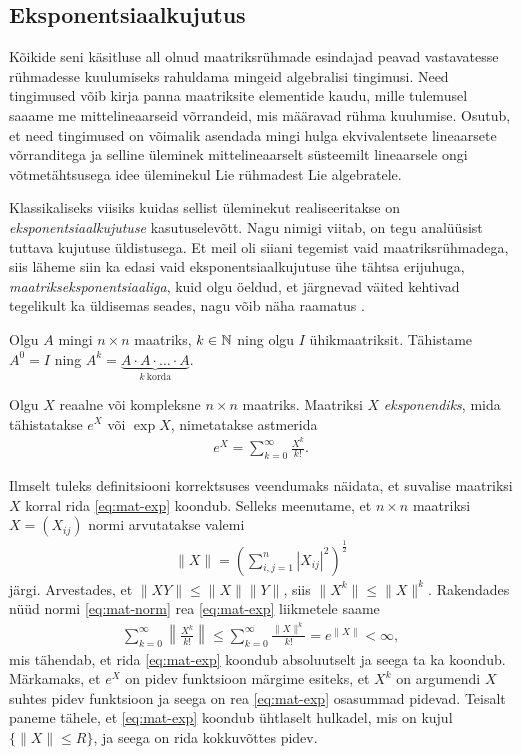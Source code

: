 \subsection{Eksponentsiaalkujutus}

Kõikide seni käsitluse all olnud maatriksrühmade esindajad peavad
vastavatesse rühmadesse kuulumiseks rahuldama mingeid algebralisi tingimusi.
Need tingimused võib kirja panna maatriksite elementide kaudu, mille
tulemusel saaame me mittelineaarseid võrrandeid, mis määravad rühma kuulumise.
Osutub, et need tingimused on võimalik asendada mingi hulga ekvivalentsete
lineaarsete võrranditega ja selline üleminek mittelineaarselt süsteemilt
lineaarsele ongi võtmetähtsusega idee üleminekul Lie rühmadest Lie
algebratele.\cite{johan1989survey}

Klassikaliseks viisiks kuidas sellist üleminekut realiseeritakse on
\emph{eksponentsiaalkujutuse} kasutuselevõtt. Nagu nimigi viitab, on
tegu analüüsist tuttava kujutuse üldistusega. Et meil oli siiani tegemist
vaid maatriksrühmadega, siis läheme siin ka edasi vaid eksponentsiaalkujutuse
ühe tähtsa erijuhuga, \emph{maatrikseksponentsiaaliga}, kuid olgu öeldud,
et järgnevad väited kehtivad tegelikult ka üldisemas seades,
nagu võib näha raamatus \cite{kirillov2008introduction}.

Olgu $A$ mingi $n \times n$ maatriks, $k \in \mathbb{N}$ ning olgu $I$
ühikmaatriksit. Tähistame $A^0 = I$ ning
$A^k = \underbrace{A \cdot A \cdot \ldots \cdot A}_{k\ \text{korda}}$.

\begin{dfn}
    Olgu $X$ reaalne või kompleksne $n \times n$ maatriks. Maatriksi
    $X$ \emph{eksponendiks}, mida tähistatakse $e^X$ või $\exp X$, nimetatakse
    astmerida
    \begin{align}\label{eq:mat-exp}
        e^X = \sum_{k=0}^{\infty} \frac{X^k}{k!}.
    \end{align}
\end{dfn}

Ilmselt tuleks definitsiooni korrektsuses veendumaks näidata, et suvalise
maatriksi $X$ korral rida \eqref{eq:mat-exp} koondub. Selleks meenutame,
et $n \times n$ maatriksi $X = (X_{ij})$ normi arvutatakse valemi
\begin{align}\label{eq:mat-norm}
    \| X \| = \left( \sum_{i,j=1}^n |X_{ij}|^2 \right)^{\frac{1}{2}}
\end{align}
järgi. Arvestades, et $\| XY \| \le \|X\| \|Y\|$, siis $\|X^k\| \le \|X\|^k$.
Rakendades nüüd normi \eqref{eq:mat-norm} rea \eqref{eq:mat-exp} liikmetele
saame
\begin{align*}
    \sum_{k=0}^\infty \left\lVert \frac{X^k}{k!} \right\rVert \le
    \sum_{k=0}^\infty \frac{\|X\|^k}{k!} = e^{\|X\|} < \infty,
\end{align*}
mis tähendab, et rida \eqref{eq:mat-exp} koondub absoluutselt ja seega
ta ka koondub. Märkamaks, et $e^X$ on pidev funktsioon märgime esiteks,
et $X^k$ on argumendi $X$ suhtes pidev funktsioon ja seega on rea
\eqref{eq:mat-exp} osasummad pidevad. Teisalt paneme tähele, et
\eqref{eq:mat-exp} koondub ühtlaselt hulkadel, mis on kujul
$\{ \|X\| \le R \}$, ja seega on rida kokkuvõttes pidev.

